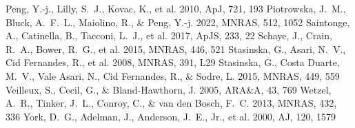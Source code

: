 \documentclass[twocolumn]{aastex631}
\begin{document}
\begin{thebibliography}{}
 Peng, Y.-j., Lilly, S.~J., Kovac, K., et al. 2010, ApJ, 721, 193
 Piotrowska, J.~M., Bluck, A.~F.~L., Maiolino, R., \& Peng, Y.-j. 2022, MNRAS, 512, 1052
 Saintonge, A., Catinella, B., Tacconi, L.~J., et al. 2017, ApJS, 233, 22
 Schaye, J., Crain, R.~A., Bower, R.~G., et al. 2015, MNRAS, 446, 521
 Stasinska, G., Asari, N.~V., Cid Fernandes, R., et al. 2008, MNRAS, 391, L29
 Stasinska, G., Costa Duarte, M.~V., Vale Asari, N., Cid Fernandes, R., \& Sodre, L. 2015, MNRAS, 449, 559
 Veilleux, S., Cecil, G., \& Bland-Hawthorn, J. 2005, ARA\&A, 43, 769
 Wetzel, A.~R., Tinker, J.~L., Conroy, C., \& van den Bosch, F.~C. 2013, MNRAS, 432, 336
 York, D.~G., Adelman, J., Anderson, J.~E., Jr., et al. 2000, AJ, 120, 1579
\end{thebibliography}
\end{document}
